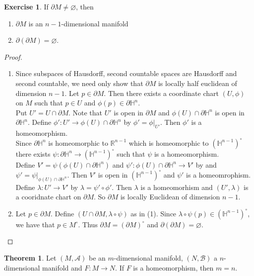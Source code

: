 \documentclass[12pt]{amsart}
\theoremstyle{definition}
\newtheorem{thm}[definition]{Theorem}
\newtheorem{ex}[definition]{Exercise}
\newcommand{\lam}{\lambda}
\renewcommand{\H}{\mathbb{H}}
\newcommand{\R}{\mathbb{R}}
\newcommand{\MA}{\mathcal{A}}
\newcommand{\MB}{\mathcal{B}}
\begin{document}
	\begin{ex}
		If $\partial M \neq \varnothing$, then 
		\begin{enumerate}
			\item $\partial M$ is an $n-1$-dimensional manifold \item $\partial (\partial M) = \varnothing$.
		\end{enumerate}
	\end{ex}

	\begin{proof}\
		\begin{enumerate}
			\item Since subspaces of Hausdorff, second countable spaces are Hausdorff and second countable, we need only show that $\partial M$ is locally half euclidean of dimension $n-1$. Let $p \in \partial M$. Then there exists a coordinate chart $(U, \phi)$ on $M$ such that $p \in U$ and $\phi(p) \in \partial \H^n$. \\
			Put $U' = U \cap \partial M$. Note that $U'$ is open in $\partial M$ and $ \phi(U) \cap \partial \H^n$ is open in $\partial \H^n$. Define  $\phi': U' \rightarrow \phi(U) \cap \partial \H^n$ by $\phi' = \phi|_{U'}$. Then $\phi'$ is a homeomorphism. \\
			Since $\partial \H^n$ is homeomorphic to $\R^{n-1}$ which is homeomorphic to $(\H^{n-1})^{\circ}$ there exists $\psi: \partial \H^n \rightarrow (\H^{n-1})^{\circ}$ such that $\psi$ is a homeomorphism.\\ 
			Define $V' = \psi(\phi(U) \cap \partial \H^n)$ and $\psi': \phi(U) \cap \partial \H^n \rightarrow V' $ by and $\psi' = \psi|_{\phi(U) \cap \partial \H^n}$. Then $V'$ is open in $(\H^{n-1})^{\circ}$ and $\psi'$ is a homeomrophism. \\ 
			Define $\lam : U' \rightarrow V'$ by $\lam = \psi' \circ \phi'$. Then $\lam$ is a homeomorhism and $(U', \lam) $ is a cooridnate chart on $\partial M$. So $\partial M$ is locally Euclidean of dimension $n-1$.  
			\item Let $p \in \partial M$. Define $(U \cap \partial M, \lam \circ \psi)$ as in (1). Since $\lam \circ \psi(p) \in (\H^{n-1})^{\circ}$, we have that $p \in M^{\circ}$. Thus $ \partial M = (\partial M)^{\circ}$ and $\partial (\partial M) = \varnothing$.
		\end{enumerate}
	\end{proof}

	\begin{thm}
		Let $(M, \MA)$ be an $m$-dimensional manifold, $(N, \MB)$ a $n$-dimensional manifold and $F: M \rightarrow N$. If $F$ is a homeomorphism, then $m = n$.
	\end{thm}
\end{document}
